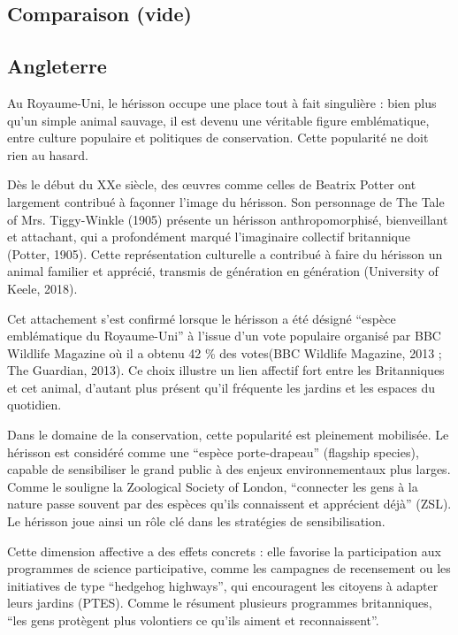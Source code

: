 \documentclass[a4paper,11pt]{article}
\begin{document}
\subsection{Comparaison (vide)}

\subsection{Angleterre}

Au Royaume-Uni, le hérisson occupe une place tout à fait singulière : bien plus qu’un simple animal sauvage, il est devenu une véritable figure emblématique, entre culture populaire et politiques de conservation. Cette popularité ne doit rien au hasard.

Dès le début du XXe siècle, des œuvres comme celles de Beatrix Potter ont largement contribué à façonner l’image du hérisson. Son personnage de The Tale of Mrs. Tiggy-Winkle (1905) présente un hérisson anthropomorphisé, bienveillant et attachant, qui a profondément marqué l’imaginaire collectif britannique (Potter, 1905). Cette représentation culturelle a contribué à faire du hérisson un animal familier et apprécié, transmis de génération en génération (University of Keele, 2018).

Cet attachement s’est confirmé lorsque le hérisson a été désigné \enquote{espèce emblématique du Royaume-Uni} à l’issue d’un vote populaire organisé par BBC Wildlife Magazine où il a obtenu 42 \% des votes(BBC Wildlife Magazine, 2013 ; The Guardian, 2013). Ce choix illustre un lien affectif fort entre les Britanniques et cet animal, d’autant plus présent qu’il fréquente les jardins et les espaces du quotidien.

Dans le domaine de la conservation, cette popularité est pleinement mobilisée. Le hérisson est considéré comme une \enquote{espèce porte-drapeau} (flagship species), capable de sensibiliser le grand public à des enjeux environnementaux plus larges. Comme le souligne la Zoological Society of London, \enquote{connecter les gens à la nature passe souvent par des espèces qu’ils connaissent et apprécient déjà} (ZSL). Le hérisson joue ainsi un rôle clé dans les stratégies de sensibilisation.

Cette dimension affective a des effets concrets : elle favorise la participation aux programmes de science participative, comme les campagnes de recensement ou les initiatives de type \enquote{hedgehog highways}, qui encouragent les citoyens à adapter leurs jardins (PTES). Comme le résument plusieurs programmes britanniques, \enquote{les gens protègent plus volontiers ce qu’ils aiment et reconnaissent}.
\end{document}
